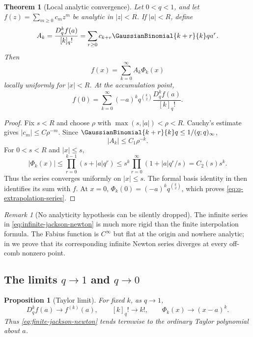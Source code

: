 \documentclass[11pt,a4paper,oneside]{article}
\newtheorem{theorem}{Theorem}[section]
\newtheorem{proposition}[proposition]{Proposition}
\theoremstyle{definition}
\theoremstyle{remark}
\newtheorem{remark}[remark]{Remark}
\begin{document}
\begin{theorem}[Local analytic convergence]
\label{thm:infinite-jackson-newton}
Let $0<q<1$, and let $f(z)=\sum_{m\ge0}c_mz^m$ be analytic in $|z|<R$.
If $|a|<R$, define
\begin{equation}
 A_k=\frac{D_q^kf(a)}{[k]_q!}
 =\sum_{r\ge0}c_{k+r}\GaussianBinomial{k+r}{k}q a^r.
 \label{eq:analytic-Ak}
\end{equation}
Then
\begin{equation}
 f(x)=\sum_{k=0}^\infty A_k\Phi_k(x)
 \label{eq:infinite-jackson-newton}
\end{equation}
locally uniformly for $|x|<R$.  At the accumulation point,
\begin{equation}
 f(0)=\sum_{k=0}^\infty
 (-a)^kq^{\binom k2}\frac{D_q^kf(a)}{[k]_q!}.
 \label{eq:q-extrapolation-series}
\end{equation}
\end{theorem}

\begin{proof}
Fix $s<R$ and choose $\rho$ with
$\max(s,|a|)<\rho<R$.  Cauchy's estimate gives
$|c_m|\le C\rho^{-m}$.  Since
$\GaussianBinomial{k+r}{k}q\le1/(q;q)_\infty$,
\[
 |A_k|\le C_1\rho^{-k}.
\]
For $0<s<R$ and $|x|\le s$,
\[
 |\Phi_k(x)|
 \le\prod_{r=0}^{k-1}(s+|a|q^r)
 \le s^k\prod_{r=0}^\infty(1+|a|q^r/s)=C_2(s)s^k.
\]
Thus the series converges uniformly on $|x|\le s$.  The formal basis identity
in  then identifies its sum with $f$.
At $x=0$, $\Phi_k(0)=(-a)^kq^{\binom k2}$, which proves
\eqref{eq:q-extrapolation-series}.
\end{proof}

\begin{remark}[No analyticity hypothesis can be silently dropped]
The infinite series in \eqref{eq:infinite-jackson-newton} is much more rigid
than the finite interpolation formula.  The Fabius function is $C^\infty$ but
flat at the origin and nowhere analytic; in  we prove that
its corresponding infinite Newton series diverges at every off-comb nonzero
point.
\end{remark}

\subsection{The limits \texorpdfstring{$q\to1$}{q to 1} and \texorpdfstring{$q\to0$}{q to 0}}

\begin{proposition}[Taylor limit]
\label{prop:taylor-limit}
For fixed $k$, as $q\to1$,
\[
 D_q^kf(a)\longrightarrow f^{(k)}(a),
 \qquad [k]_q!\longrightarrow k!,
 \qquad \Phi_k(x)\longrightarrow(x-a)^k.
\]
Thus \eqref{eq:finite-jackson-newton} tends termwise to the ordinary Taylor
polynomial about $a$.
\end{proposition}
\end{document}
